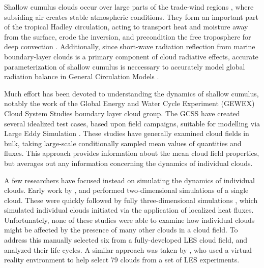 \documentclass[acp]{copernicus}
\begin{document}

\introduction

Shallow cumulus clouds occur over large parts of the trade-wind regions 
\citep{Norris1988}, where subsiding air creates stable atmospheric conditions.  
They form an important part of the tropical Hadley circulation, acting to 
transport heat and moisture away from the surface, erode the inversion, and 
precondition the free troposphere for deep convection \citep{Tiedtke1988, 
Neggers2007}.  Additionally, since short-wave radiation reflection from marine 
boundary-layer clouds is a primary component of cloud radiative effects, 
accurate parameterization of shallow cumulus is neccessary to accurately model 
global radiation balance in General Circulation Models 
\citep[GCMs;][]{Bony2005, Medeiros2008, Wyant2009, Medeiros2011}.
  
Much effort has been devoted to understanding the dynamics of shallow cumulus, 
notably the work of the Global Energy and Water Cycle Experiment (GEWEX) Cloud 
System Studies \citep[GCSS;][]{Randall2003} boundary layer cloud group.  The 
GCSS have created several idealized test cases, based upon field campaigns, 
suitable for modelling via Large Eddy Simulation \citep[LES;][]{Siebesma1995, 
Stevens2001, Brown2002, Ackerman2009, vanZanten2011}.  These studies have 
generally examined cloud fields in bulk, taking large-scale conditionally 
sampled mean values of quantities and fluxes.  This approach provides 
information about the mean cloud field properties, but averages out any 
information concerning the dynamics of individual clouds.

A few researchers have focused instead on simulating the dynamics of individual
clouds. Early work by \cite{Klaassen1985}, \cite{Bretherton1989} and 
\cite{Grabowski1991} performed two-dimensional simulations of a single 
cloud.  These were quickly followed by fully three-dimensional simulations 
\citep{Grabowski1993, Grabowski1993a, Carpenter1998, Blyth2005}, which 
simulated individual clouds initiated via the application of localized heat 
fluxes.  Unfortunately, none of these studies were able to examine how 
individual clouds might be affected by the presence of many other clouds in a 
cloud field.  To address this \cite{Zhao2005, Zhao2005a} manually selected six 
from a fully-developed LES cloud field, and analyzed their life cycles.  A 
similar approach was taken by \cite{Heus2009}, who used a virtual-reality 
environment to help select 79 clouds from a set of LES experiments.
\end{document}
